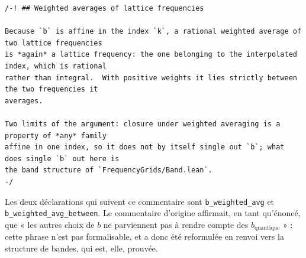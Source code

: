 \documentclass[11pt,a4paper]{article}
\newcommand{\lb}{\_\allowbreak}
\newcommand{\code}[1]{\texttt{#1}}
\theoremstyle{definition}
\theoremstyle{remark}
\begin{document}
\begin{Verbatim}[fontsize=\footnotesize,breaklines=true,breakanywhere=true]
/-! ## Weighted averages of lattice frequencies

Because `b` is affine in the index `k`, a rational weighted average of two lattice frequencies
is *again* a lattice frequency: the one belonging to the interpolated index, which is rational
rather than integral.  With positive weights it lies strictly between the two frequencies it
averages.

Two limits of the argument: closure under weighted averaging is a property of *any* family
affine in one index, so it does not by itself single out `b`; what does single `b` out here is
the band structure of `FrequencyGrids/Band.lean`.
-/
\end{Verbatim}

Les deux déclarations qui suivent ce commentaire sont \code{b\lb{}weighted\lb{}avg} et \code{b\lb{}weighted\lb{}avg\lb{}between}. Le commentaire d'origine affirmait, en tant qu'énoncé, que « les autres choix de $b$ ne parviennent pas à rendre compte des $b_{\mathrm{quantique}}$ » : cette phrase n'est pas formalisable, et a donc été reformulée en renvoi vers la structure de bandes, qui est, elle, prouvée.
\end{document}

